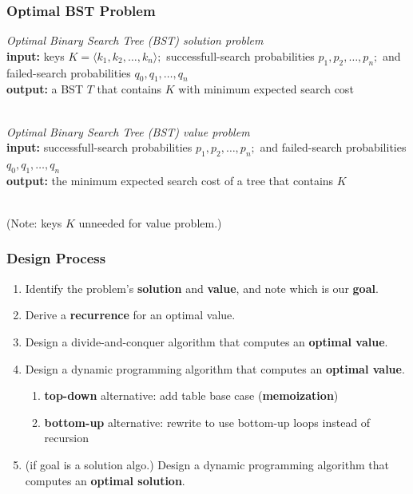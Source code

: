 \documentclass[10pt,aspectratio=169]{beamer}
\newcommand{\stanza}{ \\~\ }
\begin{document}
\begin{frame} \frametitle{Optimal BST Problem}

  \emph{Optimal Binary Search Tree (BST) solution problem} \\
  \textbf{input:} keys $K=\langle k_1, k_2, \ldots, k_n \rangle;$ successfull-search probabilities $p_1, p_2, \ldots, p_n;$ and failed-search probabilities $q_0, q_1, \ldots, q_n$ \\  
  \textbf{output:} a BST $T$ that contains $K$ with minimum expected search cost  \stanza
  
  \emph{Optimal Binary Search Tree (BST) value problem} \\
  \textbf{input:} successfull-search probabilities $p_1, p_2, \ldots, p_n;$ and failed-search probabilities $q_0, q_1, \ldots, q_n$ \\  
  \textbf{output:} the minimum expected search cost of a tree that contains $K$ \stanza

  (Note: keys $K$ unneeded for value problem.)
\end{frame}

\begin{frame} \frametitle{Design Process}
  \begin{enumerate}
    \item Identify the problem's \textbf{solution} and \textbf{value}, and note which is our \textbf{goal}.
    \item Derive a \textbf{recurrence} for an optimal value.
    \item Design a divide-and-conquer algorithm that computes an \textbf{optimal value}.
    \item Design a dynamic programming algorithm that computes an \textbf{optimal value}.
    \begin{enumerate}
      \item \textbf{top-down} alternative: add table base case (\textbf{memoization})
      \item \textbf{bottom-up} alternative: rewrite to use bottom-up loops instead of recursion
    \end{enumerate}
    \item (if goal is a solution algo.) Design a dynamic programming algorithm that computes an \textbf{optimal solution}.
  \end{enumerate}
  \end{frame}
\end{document}
